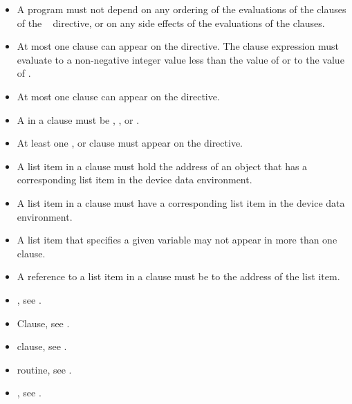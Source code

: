 \restrictions
\begin{itemize}
    \item A program must not depend on any ordering of the evaluations of the clauses of the
    ~ directive, or on any side effects of the evaluations of the clauses.

  \item At most one  clause can appear on the directive. The
     clause expression  must evaluate to a non-negative integer
    value less than the value of  or to the value of
    .

  \item At most one  clause can appear on the directive.
  \item A  in a  clause must be , ,  or .
  \item At least one ,  or 
    clause must appear on the directive.


  \item A list item in a  clause must hold the address of
    an object that has a corresponding list item in the device data environment.
  \item A list item in a  clause must have a
    corresponding list item in the device data environment.

  \item A list item that specifies a given variable may not appear in more than
	  one  clause.

  \item A reference to a list item in a  clause must be to
    the address of the list item.

\end{itemize}


\crossreferences
\begin{itemize}
\item {}, see
.

\item {} Clause, see .

\item {} clause, see
.

\item {} routine, see .

\item {}, see
.

\end{itemize}










